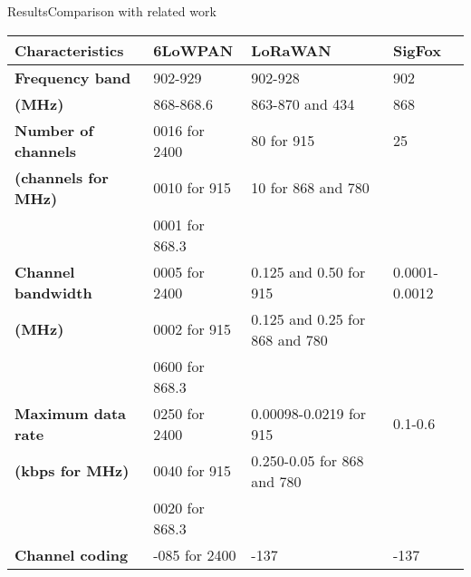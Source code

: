 \begin{frame}{Results}{Comparison with related work}
\changefontsizes{6pt}
\begin{table}[h!]
\begin{center}
	\begin{tabular}{l|l|l|l}
	\bf{Characteristics}                           & \bf{6LoWPAN}   & \bf{LoRaWAN}                    & \bf{SigFox}  \\\hline
	\bf{Frequency band}                            & 902-929        & 902-928                         & 902          \\
	\bf{\footnotesize{(MHz)}}                      & 868-868.6      & 863-870 and 434                 & 868          \\\hline
	\bf{Number of channels}                        & 0016 for 2400  & 80             for 915          & 25       \\
	\bf{\footnotesize{(channels for MHz)}}         & 0010 for 915   & 10             for 868 and 780  & \\
	\                                              & 0001 for 868.3 &                                 & \\\hline
	\bf{Channel bandwidth}                         & 0005 for 2400  & 0.125 and 0.50 for 915          & 0.0001-0.0012\\
	\bf{\footnotesize{(MHz)}}                      & 0002 for 915   & 0.125 and 0.25 for 868 and 780  & \\
	\                                              & 0600 for 868.3 &                                 & \\\hline
	\bf{Maximum data rate}                         & 0250 for 2400  & 0.00098-0.0219 for 915          & 0.1-0.6      \\
	\bf{\footnotesize{(kbps for MHz)}}             & 0040 for 915   & 0.250-0.05     for 868 and 780  & \\
	\                                              & 0020 for 868.3 &                                 & \\\hline
	\bf{Channel coding}                            & -085 for 2400  & -137                            & -137         \\

\end{tabular}
\end{center}
\end{table}
\end{frame}
